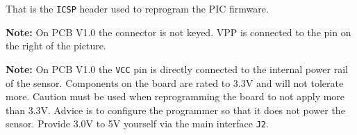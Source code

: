 \begin{multicols}{2}
	That is the \texttt{ICSP} header used to reprogram the PIC firmware.
	
	\textbf{Note:} On PCB V1.0 the connector is not keyed. VPP is connected to the pin on the right of the picture.
	
	\textbf{Note:} On PCB V1.0 the \texttt{VCC} pin is directly connected to the internal power rail of the sensor. Components on the board are rated to 3.3V and will not tolerate more. Caution must be used when reprogramming the board to not apply more than 3.3V. Advice is to configure the programmer so that it does not power the sensor. Provide 3.0V to 5V yourself via the main interface \texttt{J2}.
	
\end{multicols}